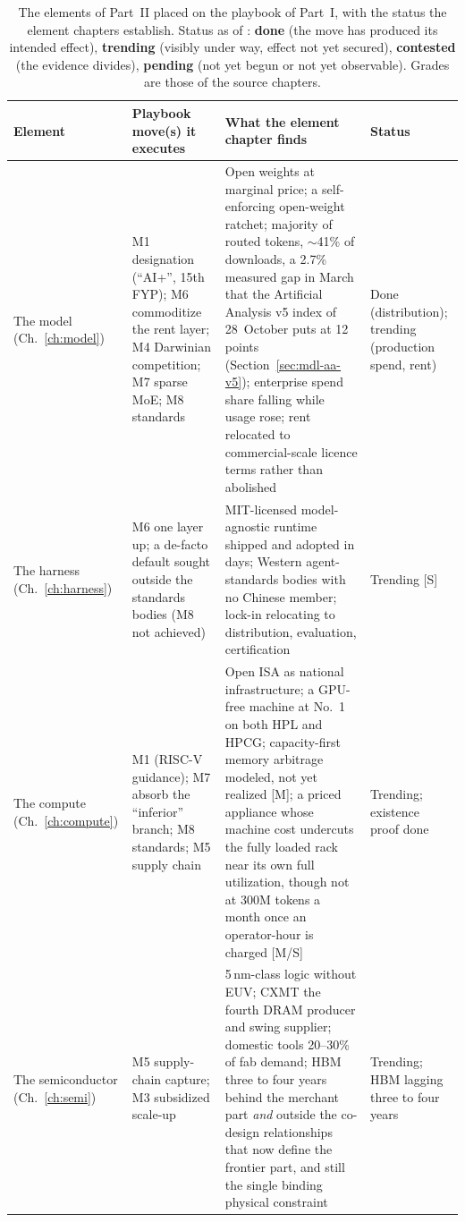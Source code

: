 \begin{table}[htbp]
\centering\footnotesize
\caption{The elements of Part~II placed on the playbook of Part~I, with the status the element chapters establish. Status as of \datafreeze: \textbf{done} (the move has produced its intended effect), \textbf{trending} (visibly under way, effect not yet secured), \textbf{contested} (the evidence divides), \textbf{pending} (not yet begun or not yet observable). Grades are those of the source chapters.}
\label{tab:assembled}
\begin{tabular}{@{}p{22mm}p{49mm}p{57mm}p{18mm}@{}}
\toprule
\textbf{Element} & \textbf{Playbook move(s) it executes} & \textbf{What the element chapter finds} & \textbf{Status} \\
\midrule
The model (Ch.~\ref{ch:model}) & M1 designation (``AI+'', 15th FYP); M6 commoditize the rent layer; M4 Darwinian competition; M7 sparse MoE; M8 standards & Open weights at marginal price; a self-enforcing open-weight ratchet; majority of routed tokens, $\sim$41\% of downloads, a 2.7\% measured gap in March that the Artificial Analysis v5 index of 28~October puts at 12 points (Section~\ref{sec:mdl-aa-v5}); enterprise spend share falling while usage rose; rent relocated to commercial-scale licence terms rather than abolished & Done (distribution); trending (production spend, rent) \\
The harness (Ch.~\ref{ch:harness}) & M6 one layer up; a de-facto default sought outside the standards bodies (M8 not achieved) & MIT-licensed model-agnostic runtime shipped and adopted in days; Western agent-standards bodies with no Chinese member; lock-in relocating to distribution, evaluation, certification & Trending [S] \\
The compute (Ch.~\ref{ch:compute}) & M1 (RISC-V guidance); M7 absorb the ``inferior'' branch; M8 standards; M5 supply chain & Open ISA as national infrastructure; a GPU-free machine at No.~1 on both HPL and HPCG; capacity-first memory arbitrage modeled, not yet realized [M]; a priced appliance whose machine cost undercuts the fully loaded rack near its own full utilization, though not at 300M tokens a month once an operator-hour is charged [M/S] & Trending; existence proof done \\
The semiconductor (Ch.~\ref{ch:semi}) & M5 supply-chain capture; M3 subsidized scale-up & 5\,nm-class logic without EUV; CXMT the fourth DRAM producer and swing supplier; domestic tools 20--30\% of fab demand; HBM three to four years behind the merchant part \emph{and} outside the co-design relationships that now define the frontier part, and still the single binding physical constraint & Trending; HBM lagging three to four years \\

\end{tabular}
\end{table}
